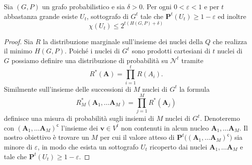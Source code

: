 \begin{theorem}
	[K\"orner] Sia \((G,P)\) un grafo probabilistico e sia \(\delta>0\). Per ogni \(0<\varepsilon<1\) e per \(t\) abbastanza grande esiste \(U_{t}\), sottografo di \(G^{t}\) tale che \(\mathbf{P}^t(U_{t})\ge 1-\varepsilon\) ed inoltre
	\[\chi(U_{t})\le 2^{t(H(G,P)+\delta)}\]
\end{theorem}
\begin{proof}
	Sia \(R\) la distribuzione marginale sull'insieme dei nuclei della \(Q\) che realizza il minimo \(H(G,P)\). Poiché i nuclei di \(G^t\) sono prodotti cartesiani di \(t\) nuclei di \(G\) possiamo definire una distribuzione di probabilità su \(\mathcal{N}^t\) tramite
	\[R^{*}(\mathbf{A}) = \prod_{i=1}^t R(A_{i}).\]
	Similmente sull'insieme delle successioni di \(M\) nuclei di \(G^t\) la formula
	\[R_{M}^{*}(\mathbf{A}_{1},\dots\mathbf{A}_{M}) = \prod_{j=1}^M R^{*}(\mathbf{A}_j)\]
	definisce una misura di probabilità sugli insiemi di \(M\) nuclei di \(G^t\). Denoteremo con \((\mathbf{A}_{1},\dots\mathbf{A}_{M})^{\mathsf{c}}\) l'insieme dei \(\mathbf{v}\in V^{t}\) non contenuti in alcun nucleo \(\mathbf{A}_{1},\dots\mathbf{A}_{M}\). Il nostro obiettivo è trovare un \(M\) per cui il valore atteso di \(\mathbf{P}^t\big((\mathbf{A}_{1},\dots\mathbf{A}_{M})^{\mathsf{c}}\big)\) sia minore di \(\varepsilon\), in modo che esista un sottografo \(U_{t}\) ricoperto dai nuclei \(\mathbf{A}_{1},\dots\mathbf{A}_{M}\) e tale che \(\mathbf{P}^t(U_{t})\ge 1-\varepsilon\).
	

\end{proof}
